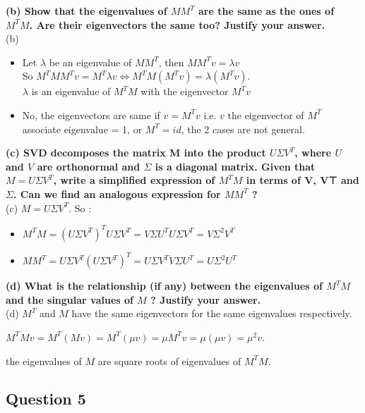 \documentclass{article}
\begin{document}
\vspace{1em}
{\bf (b) Show that the eigenvalues of $MM^{T}$ are the same as the ones of $M^{T}M$. Are their eigenvectors the same too? Justify your answer.}\\

(b)
\begin{itemize}
	\item Let $\lambda$ be an eigenvalue of $MM^T$, then $MM^Tv=\lambda v$ \\   So $M^TMM^Tv=M^T \lambda v \iff M^TM(M^Tv)=\lambda (M^T v)$. \\  $\lambda$ is an eigenvalue of $M^TM$ with the eigenvector $M^T v$

	\item No, the eigenvectors are same if $v = M^T v$ i.e. $v$ the eigenvector of $M^T$ associate eigenvalue = 1, or $M^T = id$, the 2 cases are not general.
\end{itemize}


\vspace{1em}
{\bf (c) SVD decomposes the matrix M into the product $U\Sigma V^T$, where $U$ and $V$ are orthonormal and $\Sigma$ is a diagonal matrix. Given that $M=U\Sigma V^T$, write a simplified expression of $M^{T}M$ in terms of V, V⊤ and $\Sigma$. Can we find an analogous expression for $MM^{T}$ ?}\\

(c) $M=U\Sigma V^T$. So :

\begin{itemize}
	\item $M^{T}M=(U\Sigma V^T)^T U\Sigma V^T= V \Sigma U^T U\Sigma V^T=V \Sigma^2 V^T$
	\item $MM^{T}= U\Sigma V^T (U\Sigma V^T)^T = U\Sigma V^TV\Sigma U^T = U \Sigma^2U^T $
\end{itemize}



\vspace{1em}
{\bf (d) What is the relationship (if any) between the eigenvalues of $M^{T}M$ and the singular values of $M$ ? Justify your answer.}\\


(d) $M^T$ and $M$ have the same eigenvectors for the same eigenvalues respectively.

$M^TMv=M^T(Mv)=M^T(\mu v)=\mu M^Tv=\mu (\mu v)=\mu^2 v$.

the eigenvalues of $M$ are square roots of eigenvalues of $M^TM$. 

\subsection{Question 5}
\end{document}
